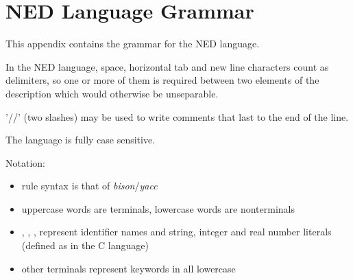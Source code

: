 \chapter{NED Language Grammar}
\label{cha:ned-language-grammar}

This appendix contains the grammar for the NED language.

In the NED language, space, horizontal tab and new line characters count
as delimiters, so one or more of them is required between two elements of the
description which would otherwise be unseparable.

'//' (two slashes) may be used to write comments that last to the end of the line.

The language is fully case sensitive.

Notation:
\begin{itemize}
  \item{rule syntax is that of \textit{bison}/\textit{yacc}}
  \item{uppercase words are terminals, lowercase words are nonterminals}
  \item{, , ,
         represent identifier names and string,
        integer and real number literals (defined as in the C language)}
  \item{other terminals represent keywords in all lowercase}
\end{itemize}


%
%
%
%
%


